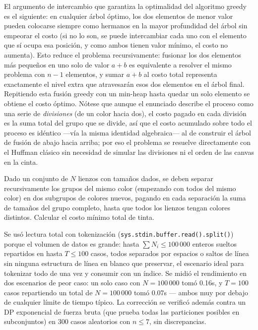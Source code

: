 El argumento de intercambio que garantiza la optimalidad del algoritmo greedy es el siguiente: en cualquier árbol óptimo, los dos elementos de menor valor pueden colocarse siempre como hermanos en la mayor profundidad del árbol sin empeorar el costo (si no lo son, se puede intercambiar cada uno con el elemento que sí ocupa esa posición, y como ambos tienen valor mínimo, el costo no aumenta). Esto reduce el problema recursivamente: fusionar los dos elementos más pequeños en uno solo de valor $a+b$ es equivalente a resolver el mismo problema con $n-1$ elementos, y sumar $a+b$ al costo total representa exactamente el nivel extra que atravesarán esos dos elementos en el árbol final. Repitiendo esta fusión greedy con un min-heap hasta quedar un solo elemento se obtiene el costo óptimo. Nótese que aunque el enunciado describe el proceso como una serie de \emph{divisiones} (de un color hacia dos), el costo pagado en cada división es la suma total del grupo que se divide, así que el costo acumulado sobre todo el proceso es idéntico —vía la misma identidad algebraica— al de construir el árbol de fusión de abajo hacia arriba; por eso el problema se resuelve directamente con el Huffman clásico sin necesidad de simular las divisiones ni el orden de las canvas en la cinta.


Dado un conjunto de $N$ lienzos con tamaños dados, se deben separar recursivamente los grupos del mismo color (empezando con todos del mismo color) en dos subgrupos de colores nuevos, pagando en cada separación la suma de tamaños del grupo completo, hasta que todos los lienzos tengan colores distintos. Calcular el costo mínimo total de tinta.

 Se usó lectura total con tokenización (\texttt{sys.stdin.buffer.read().split()}) porque el volumen de datos es grande: hasta $\sum N_i \le 100\,000$ enteros sueltos repartidos en hasta $T \le 100$ casos, todos separados por espacios o saltos de línea sin ninguna estructura de línea en blanco que preservar, el escenario ideal para tokenizar todo de una vez y consumir con un índice. Se midió el rendimiento en dos escenarios de peor caso: un solo caso con $N=100\,000$ tomó 0.16s, y $T=100$ casos repartiendo un total de $N=100\,000$ tomó 0.07s — ambos muy por debajo de cualquier límite de tiempo típico. La corrección se verificó además contra un DP exponencial de fuerza bruta (que prueba todas las particiones posibles en subconjuntos) en 300 casos aleatorios con $n \le 7$, sin discrepancias.

